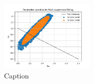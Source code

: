 \begin{figure}
\centering
\includegraphics[width=0.4\textwidth]{../Milestone 1/Plots/supernovafitting_confidence_regions.png}
\caption{Caption}
\label{fig:milestone_1_supernovafitting_confidence_regions}
\end{figure}
